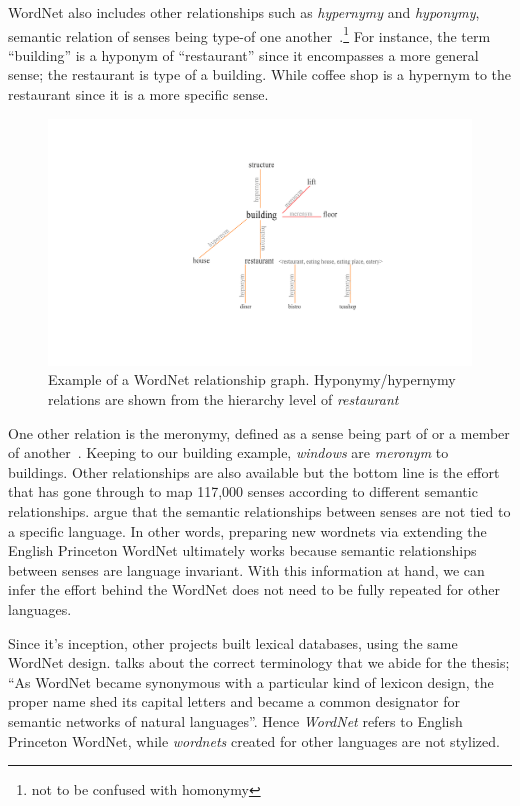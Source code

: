 WordNet also includes other relationships such as \emph{hypernymy} and \emph{hyponymy}, semantic relation of senses being type-of one another~\cite{miller_nouns_1990}.\footnote{not to be confused with homonymy}
For instance, the term \enquote{building} is a hyponym of \enquote{restaurant} since it encompasses a more general sense; the restaurant is type of a building.
While coffee shop is a hypernym to the restaurant since it is a more specific sense.

\begin{figure}[htbp]
    \centering
    \includegraphics[page=1,width=\textwidth]{Figures/hyponym_hypernym.pdf}
    \caption{Example of a WordNet relationship graph. Hyponymy/hypernymy relations are shown from the hierarchy level of \emph{restaurant}}%
    \label{fig:hyponymy}
\end{figure}

One other relation is the meronymy, defined as a sense being part of or a member of another~\cite{winston_taxonomy_1987}.
Keeping to our building example, \emph{windows} are \emph{meronym} to buildings.
Other relationships are also available but the bottom line is the effort that has gone through to map 117,000 senses according to different semantic relationships.
\textcite{sagot_building_2008} argue that the semantic relationships between senses are not tied to a specific language.
In other words, preparing new wordnets via extending the English Princeton WordNet ultimately works because semantic relationships between senses are language invariant.
With this information at hand, we can infer the effort behind the WordNet does not need to be fully repeated for other languages.

Since it's inception, other projects built lexical databases, using the same WordNet design.
\textcite{fellbaumWordNet1998} talks about the correct terminology that we abide for the thesis; \enquote{As WordNet became synonymous with a particular kind of lexicon design, the proper name shed its capital letters and became a common designator for semantic networks of natural languages}.
Hence \emph{WordNet} refers to English Princeton WordNet, while \emph{wordnets} created for other languages are not stylized.

